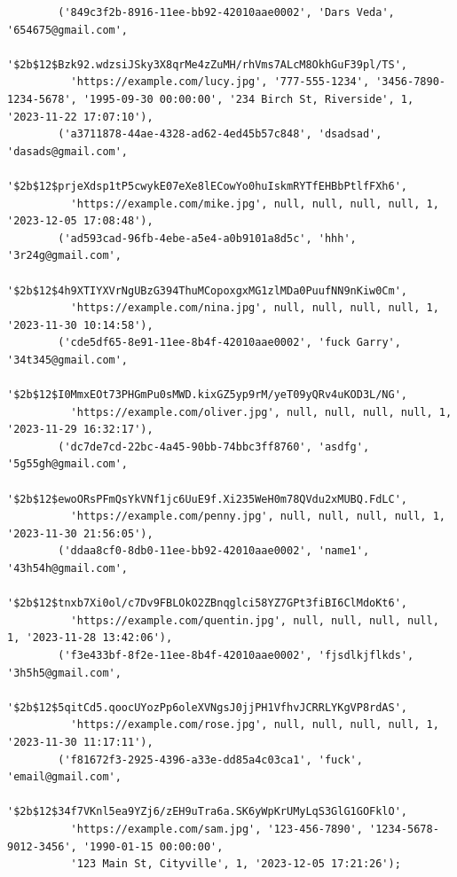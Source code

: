 \documentclass[a4paper, 12pt]{article}
\begin{document}
\begin{verbatim}
        ('849c3f2b-8916-11ee-bb92-42010aae0002', 'Dars Veda', '654675@gmail.com',
         '$2b$12$Bzk92.wdzsiJSky3X8qrMe4zZuMH/rhVms7ALcM8OkhGuF39pl/TS',
          'https://example.com/lucy.jpg', '777-555-1234', '3456-7890-1234-5678', '1995-09-30 00:00:00', '234 Birch St, Riverside', 1, '2023-11-22 17:07:10'),
        ('a3711878-44ae-4328-ad62-4ed45b57c848', 'dsadsad', 'dasads@gmail.com',
         '$2b$12$prjeXdsp1tP5cwykE07eXe8lECowYo0huIskmRYTfEHBbPtlfFXh6',
          'https://example.com/mike.jpg', null, null, null, null, 1, '2023-12-05 17:08:48'),
        ('ad593cad-96fb-4ebe-a5e4-a0b9101a8d5c', 'hhh', '3r24g@gmail.com',
         '$2b$12$4h9XTIYXVrNgUBzG394ThuMCopoxgxMG1zlMDa0PuufNN9nKiw0Cm',
          'https://example.com/nina.jpg', null, null, null, null, 1, '2023-11-30 10:14:58'),
        ('cde5df65-8e91-11ee-8b4f-42010aae0002', 'fuck Garry', '34t345@gmail.com',
         '$2b$12$I0MmxEOt73PHGmPu0sMWD.kixGZ5yp9rM/yeT09yQRv4uKOD3L/NG',
          'https://example.com/oliver.jpg', null, null, null, null, 1, '2023-11-29 16:32:17'),
        ('dc7de7cd-22bc-4a45-90bb-74bbc3ff8760', 'asdfg', '5g55gh@gmail.com',
         '$2b$12$ewoORsPFmQsYkVNf1jc6UuE9f.Xi235WeH0m78QVdu2xMUBQ.FdLC',
          'https://example.com/penny.jpg', null, null, null, null, 1, '2023-11-30 21:56:05'),
        ('ddaa8cf0-8db0-11ee-bb92-42010aae0002', 'name1', '43h54h@gmail.com',
         '$2b$12$tnxb7Xi0ol/c7Dv9FBLOkO2ZBnqglci58YZ7GPt3fiBI6ClMdoKt6',
          'https://example.com/quentin.jpg', null, null, null, null, 1, '2023-11-28 13:42:06'),
        ('f3e433bf-8f2e-11ee-8b4f-42010aae0002', 'fjsdlkjflkds', '3h5h5@gmail.com',
         '$2b$12$5qitCd5.qoocUYozPp6oleXVNgsJ0jjPH1VfhvJCRRLYKgVP8rdAS',
          'https://example.com/rose.jpg', null, null, null, null, 1, '2023-11-30 11:17:11'),
        ('f81672f3-2925-4396-a33e-dd85a4c03ca1', 'fuck', 'email@gmail.com',
         '$2b$12$34f7VKnl5ea9YZj6/zEH9uTra6a.SK6yWpKrUMyLqS3GlG1GOFklO',
          'https://example.com/sam.jpg', '123-456-7890', '1234-5678-9012-3456', '1990-01-15 00:00:00', 
          '123 Main St, Cityville', 1, '2023-12-05 17:21:26');
          

\end{verbatim}
\end{document}

